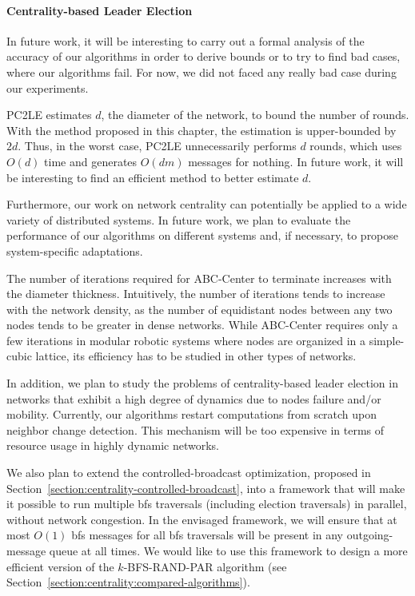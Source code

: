 \paragraph{Centrality-based Leader Election}

In future work, it will be interesting to carry out a formal analysis of the accuracy of our algorithms in order to derive bounds or to try to find bad cases, where our algorithms fail. For now, we did not faced any really bad case during our experiments.

PC2LE estimates $d$, the diameter of the network, to bound the number of rounds. With the method proposed in this chapter, the estimation is upper-bounded by $2d$. Thus, in the worst case, PC2LE unnecessarily performs $d$ rounds, which uses $O(d)$ time and generates $O(dm)$ messages for nothing. In future work, it will be interesting to find an efficient method to better estimate $d$.

Furthermore, our work on network centrality can potentially be applied to a wide variety of distributed systems. In future work, we plan to evaluate the performance of our algorithms on different systems and, if necessary, to propose system-specific adaptations. 

The number of iterations required for ABC-Center to terminate increases with the diameter thickness. Intuitively, the number of iterations tends to increase with the network density, as the number of equidistant nodes between any two nodes tends to be greater in dense networks. While ABC-Center requires only a few iterations in modular robotic systems where nodes are organized in a simple-cubic lattice, its efficiency has to be studied in other types of networks.

In addition, we plan to study the problems of centrality-based leader election in networks that exhibit a high degree of dynamics due to nodes failure and/or mobility. Currently, our algorithms restart computations from scratch upon neighbor change detection. This mechanism will be too expensive in terms of resource usage in highly dynamic networks.

We also plan to extend the controlled-broadcast optimization, proposed in Section~\ref{section:centrality-controlled-broadcast}, into a framework that will make it possible to run multiple \gls{bfs} traversals (including election traversals) in parallel, without network congestion. In the envisaged framework, we will ensure that at most $O(1)$ \gls{bfs} messages for all \gls{bfs} traversals will be present in any outgoing-message queue at all times. We would like to use this framework to design a more efficient version of the $k$-BFS-RAND-PAR algorithm (see Section~\ref{section:centrality:compared-algorithms}).

